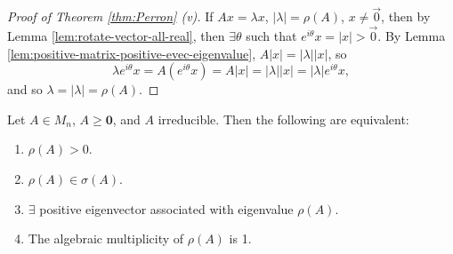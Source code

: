 \begin{proof}[Proof of Theorem \ref{thm:Perron} (v)]
If $Ax = \lambda x$, $|\lambda| = \rho(A)$, $x \not=\Vec{0}$, then by Lemma \ref{lem:rotate-vector-all-real}, then $\exists\theta$ such that $e^{i\theta}x = |x| > \Vec{0}$. By Lemma \ref{lem:positive-matrix-positive-evec-eigenvalue}, $A|x| = |\lambda||x|$, so
\[
\lambda e^{i\theta}x = A(e^{i\theta}x) = A|x| = |\lambda||x| = |\lambda|e^{i\theta}x,
\]
and so $\lambda = |\lambda| = \rho(A)$.
\end{proof}

\begin{theorem}
\label{thm:Perron-Frobenius}
Let $A \in M_n$, $A \ge \mathbf{0}$, and $A$ irreducible. Then the following are equivalent:
\begin{enumerate}
    \item $\rho(A) > 0$.
    \item $\rho(A) \in \sigma(A)$.
    \item $\exists$ positive eigenvector associated with eigenvalue $\rho(A)$.
    \item The algebraic multiplicity of $\rho(A)$ is 1.
\end{enumerate}
\end{theorem}